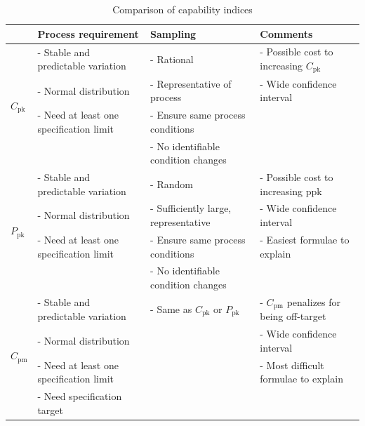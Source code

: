 \begin{longtable}[l]{llll}
    \caption{Comparison of capability indices} \label{tab:comparison_capability_indices} \\
    \toprule
                                               & \textbf{Process requirement}            & \textbf{Sampling}                        & \textbf{Comments} \\
    \midrule
    \endhead %
    \multirow[t]{4}{*}{$C_\text{pk}$}          & - Stable and predictable variation      & - Rational                               & - Possible cost to increasing $C_\text{pk}$ \\
                                               & - Normal distribution                   & - Representative of process              & - Wide confidence interval \\
                                               & - Need at least one specification limit & - Ensure same process conditions         & \\
                                               &                                         & - No identifiable condition changes      & \\
    \midrule %
    \multirow[t]{4}{*}{$P_\text{pk}$}          & - Stable and predictable variation      & - Random                                 & - Possible cost to increasing ppk \\
                                               & - Normal distribution                   & - Sufficiently large, representative     & - Wide confidence interval \\
                                               & - Need at least one specification limit & - Ensure same process conditions         & - Easiest formulae to explain \\
                                               &                                         & - No identifiable condition changes      & \\
    \midrule
    \multirow[t]{4}{*}{$C_\text{pm}$}          & - Stable and predictable variation      & - Same as $C_\text{pk}$ or $P_\text{pk}$ & - $C_\text{pm}$ penalizes for being off-target \\
                                               & - Normal distribution                   &                                          & - Wide confidence interval \\
                                               & - Need at least one specification limit &                                          & - Most difficult formulae to explain \\
                                               & - Need specification target             &                                          & \\
    \bottomrule
\end{longtable}
